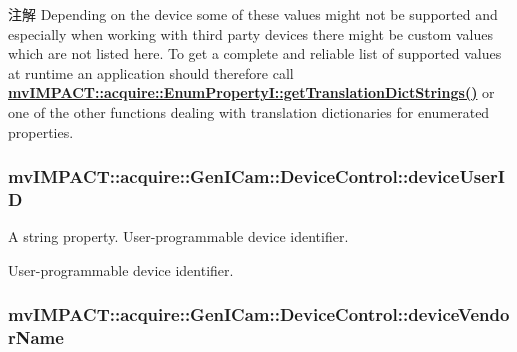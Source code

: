 \begin{DoxyNote}{注解}
Depending on the device some of these values might not be supported and especially when working with third party devices there might be custom values which are not listed here. To get a complete and reliable list of supported values at runtime an application should therefore call {\bfseries \hyperlink{classmv_i_m_p_a_c_t_1_1acquire_1_1_enum_property_i_a0ba6ccbf5ee69784d5d0b537924d26b6}{mv\+I\+M\+P\+A\+C\+T\+::acquire\+::\+Enum\+Property\+I\+::get\+Translation\+Dict\+Strings()}} or one of the other functions dealing with translation dictionaries for enumerated properties. 
\end{DoxyNote}
\hypertarget{classmv_i_m_p_a_c_t_1_1acquire_1_1_gen_i_cam_1_1_device_control_a93c4d5949d939e7be9e663b78c53a67a}{
\subsubsection[{device\+User\+I\+D}]{ mv\+I\+M\+P\+A\+C\+T\+::acquire\+::\+Gen\+I\+Cam\+::\+Device\+Control\+::device\+User\+I\+D}}\label{classmv_i_m_p_a_c_t_1_1acquire_1_1_gen_i_cam_1_1_device_control_a93c4d5949d939e7be9e663b78c53a67a}


A string property. User-\/programmable device identifier. 

User-\/programmable device identifier. \hypertarget{classmv_i_m_p_a_c_t_1_1acquire_1_1_gen_i_cam_1_1_device_control_aea67bea3bea7c8c363bb3c6100e7004f}{
\subsubsection[{device\+Vendor\+Name}]{ mv\+I\+M\+P\+A\+C\+T\+::acquire\+::\+Gen\+I\+Cam\+::\+Device\+Control\+::device\+Vendor\+Name}}\label{classmv_i_m_p_a_c_t_1_1acquire_1_1_gen_i_cam_1_1_device_control_aea67bea3bea7c8c363bb3c6100e7004f}


